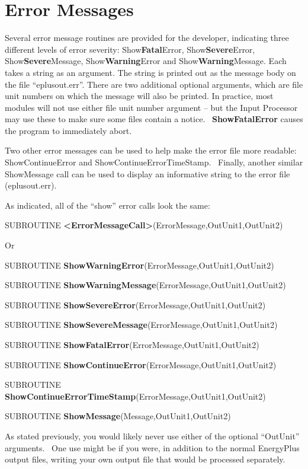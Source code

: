 \section{Error Messages}\label{error-messages}

Several error message routines are provided for the developer, indicating three different levels of error severity: Show\textbf{Fatal}Error, Show\textbf{Severe}Error, Show\textbf{Severe}Message, Show\textbf{Warning}Error and Show\textbf{Warning}Message. Each takes a string as an argument. The string is printed out as the message body on the file ``eplusout.err''. There are two additional optional arguments, which are file unit numbers on which the message will also be printed. In practice, most modules will not use either file unit number argument -- but the Input Processor may use these to make sure some files contain a notice. ~\textbf{ShowFatalError} causes the program to immediately abort.

Two other error messages can be used to help make the error file more readable: ShowContinueError and ShowContinueErrorTimeStamp.~ Finally, another similar ShowMessage call can be used to display an informative string to the error file (eplusout.err).

As indicated, all of the ``show'' error calls look the same:

SUBROUTINE \textbf{\textless{}ErrorMessageCall\textgreater{}}(ErrorMessage,OutUnit1,OutUnit2)

Or

SUBROUTINE \textbf{ShowWarningError}(ErrorMessage,OutUnit1,OutUnit2)

SUBROUTINE \textbf{ShowWarningMessage}(ErrorMessage,OutUnit1,OutUnit2)

SUBROUTINE \textbf{ShowSevereError}(ErrorMessage,OutUnit1,OutUnit2)

SUBROUTINE \textbf{ShowSevereMessage}(ErrorMessage,OutUnit1,OutUnit2)

SUBROUTINE \textbf{ShowFatalError}(ErrorMessage,OutUnit1,OutUnit2)

SUBROUTINE \textbf{ShowContinueError}(ErrorMessage,OutUnit1,OutUnit2)

SUBROUTINE \textbf{ShowContinueErrorTimeStamp}(ErrorMessage,OutUnit1,OutUnit2)

SUBROUTINE \textbf{ShowMessage}(Message,OutUnit1,OutUnit2)

As stated previously, you would likely never use either of the optional ``OutUnit'' arguments.~ One use might be if you were, in addition to the normal EnergyPlus output files, writing your own output file that would be processed separately.

